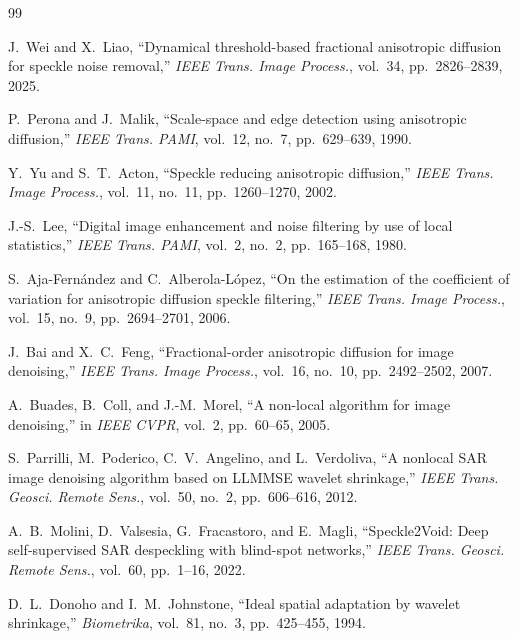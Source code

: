 \documentclass[12pt,a4paper]{article}
\begin{document}
\begin{thebibliography}{99}

J.~Wei and X.~Liao, ``Dynamical threshold-based fractional anisotropic diffusion for speckle noise removal,'' \textit{IEEE Trans. Image Process.}, vol.~34, pp.~2826--2839, 2025.

P.~Perona and J.~Malik, ``Scale-space and edge detection using anisotropic diffusion,'' \textit{IEEE Trans. PAMI}, vol.~12, no.~7, pp.~629--639, 1990.

Y.~Yu and S.~T.~Acton, ``Speckle reducing anisotropic diffusion,'' \textit{IEEE Trans. Image Process.}, vol.~11, no.~11, pp.~1260--1270, 2002.

J.-S.~Lee, ``Digital image enhancement and noise filtering by use of local statistics,'' \textit{IEEE Trans. PAMI}, vol.~2, no.~2, pp.~165--168, 1980.

S.~Aja-Fern\'{a}ndez and C.~Alberola-L\'{o}pez, ``On the estimation of the coefficient of variation for anisotropic diffusion speckle filtering,'' \textit{IEEE Trans. Image Process.}, vol.~15, no.~9, pp.~2694--2701, 2006.

J.~Bai and X.~C.~Feng, ``Fractional-order anisotropic diffusion for image denoising,'' \textit{IEEE Trans. Image Process.}, vol.~16, no.~10, pp.~2492--2502, 2007.

A.~Buades, B.~Coll, and J.-M.~Morel, ``A non-local algorithm for image denoising,'' in \textit{IEEE CVPR}, vol.~2, pp.~60--65, 2005.

S.~Parrilli, M.~Poderico, C.~V.~Angelino, and L.~Verdoliva, ``A nonlocal SAR image denoising algorithm based on LLMMSE wavelet shrinkage,'' \textit{IEEE Trans. Geosci. Remote Sens.}, vol.~50, no.~2, pp.~606--616, 2012.

A.~B.~Molini, D.~Valsesia, G.~Fracastoro, and E.~Magli, ``Speckle2Void: Deep self-supervised SAR despeckling with blind-spot networks,'' \textit{IEEE Trans. Geosci. Remote Sens.}, vol.~60, pp.~1--16, 2022.

D.~L.~Donoho and I.~M.~Johnstone, ``Ideal spatial adaptation by wavelet shrinkage,'' \textit{Biometrika}, vol.~81, no.~3, pp.~425--455, 1994.

\end{thebibliography}
\end{document}
